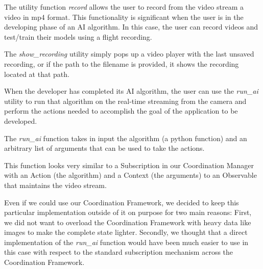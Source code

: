 The utility function \textit{record} allows the user to record from the video stream a video in mp4 format. 
This functionality is significant when the user is in the developing phase of an AI algorithm. 
In this case, the user can record videos and test/train their models using a flight recording.

The \textit{show\_recording} utility simply pops up a video player with the last unsaved recording, or if the path to the filename is provided, it shows the recording located at that path.

When the developer has completed its AI algorithm, the user can use the \textit{run\_ai} utility to run that algorithm on the real-time streaming from the camera and perform the actions needed to accomplish the goal of the application to be developed.

The \textit{run\_ai} function takes in input the algorithm (a python function) and an arbitrary list of arguments that can be used to take the actions.

This function looks very similar to a Subscription in our Coordination Manager with an Action (the algorithm) and a Context (the arguments) to an Observable that maintains the video stream.

Even if we could use our Coordination Framework, we decided to keep this particular implementation outside of it on purpose for two main reasons:
First, we did not want to overload the Coordination Framework with heavy data like images to make the complete state lighter.
Secondly, we thought that a direct implementation of the \textit{run\_ai} function would have been much easier to use in this case with respect to the standard subscription mechanism across the Coordination Framework.

